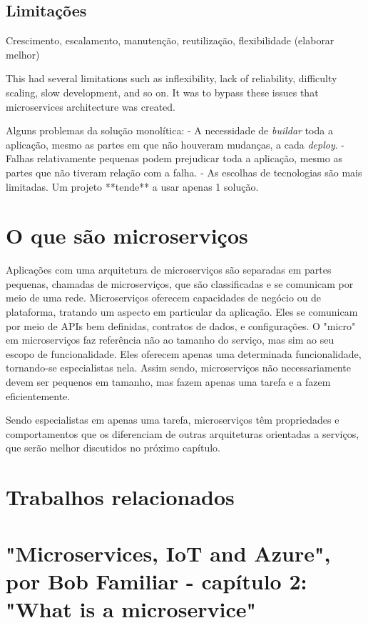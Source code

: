 \subsection{Limitações}

Crescimento, escalamento, manutenção, reutilização, flexibilidade (elaborar melhor)

This had several limitations such as inflexibility, lack of reliability, difficulty scaling, slow development, and so on. It was to bypass these issues that microservices architecture was created.

Alguns problemas da solução monolítica:
- A necessidade de \emph{buildar} toda a aplicação, mesmo as partes em que não houveram mudanças, a cada \emph{deploy}.
- Falhas relativamente pequenas podem prejudicar toda a aplicação, mesmo as partes que não tiveram relação com a falha.
- As escolhas de tecnologias são mais limitadas. Um projeto **tende** a usar apenas 1 solução.

\section{O que são microserviços}

Aplicações com uma arquitetura de microserviços são separadas em partes pequenas, chamadas de microserviços, que são classificadas e se comunicam por meio de uma rede. Microserviços oferecem capacidades de negócio ou de plataforma, tratando um aspecto em particular da aplicação. Eles se comunicam por meio de APIs bem definidas, contratos de dados, e configurações. O "micro" em microserviços faz referência não ao tamanho do serviço, mas sim ao seu escopo de funcionalidade. Eles oferecem apenas uma determinada funcionalidade, tornando-se especialistas nela. Assim sendo, microserviços não necessariamente devem ser pequenos em tamanho, mas fazem apenas uma tarefa e a fazem eficientemente. 
 
Sendo especialistas em apenas uma tarefa, microserviços têm propriedades e comportamentos que os diferenciam de outras arquiteturas orientadas a serviços, que serão melhor discutidos no próximo capítulo.


\section{Trabalhos relacionados}

\section*{"Microservices, IoT and Azure", por Bob Familiar - capítulo 2: "What is a microservice"}


